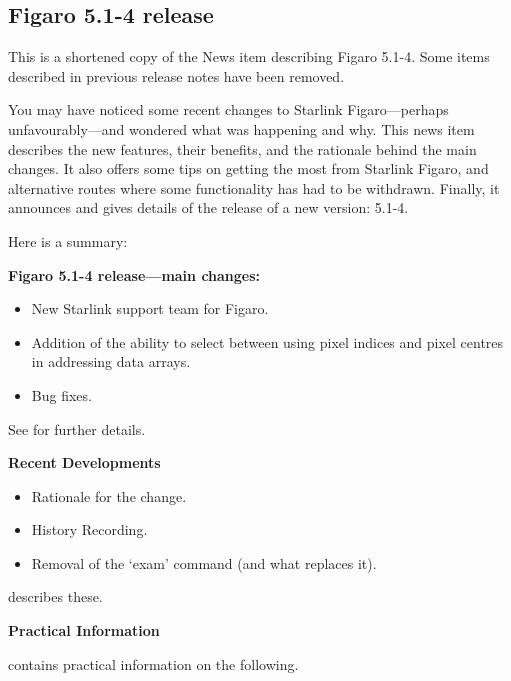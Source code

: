 
\subsection{\label{news514}Figaro 5.1-4 release}

This is a shortened copy of the News item describing Figaro 5.1-4.
Some items described in previous release notes have been removed.

 You may have noticed some recent changes to Starlink
 Figaro---perhaps unfavourably---and wondered what was happening
 and why.  This news item describes the new features, their
 benefits, and the rationale behind the main changes.  It also
 offers some tips on getting the most from Starlink Figaro, and
 alternative routes where some functionality has had to be
 withdrawn.  Finally, it announces and gives details of the
 release of a new version: 5.1-4.

 Here is a summary:

{\bf Figaro 5.1-4 release---main changes:}

\begin{itemize}
\item New Starlink support team for Figaro.
\item Addition of the ability to select between using pixel indices
      and pixel centres in addressing data arrays.
\item Bug fixes.
\end{itemize}

 See  for further details.

{\bf Recent Developments}

\begin{itemize}
\item Rationale for the change.
\item History Recording.
\item Removal of the `exam' command (and what replaces it).
\end{itemize}

  describes these.

{\bf Practical Information}

  contains practical information on the following.

